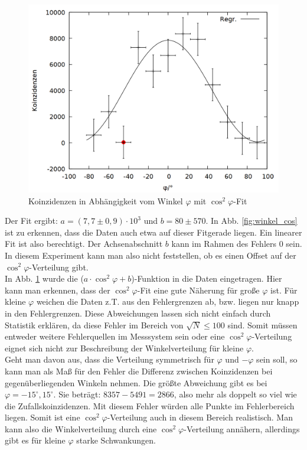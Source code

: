\begin{figure}
\centering
\includegraphics[width=0.75\linewidth]{data/friedrich/winkel_ges.png}
\caption{Koinzidenzen in Abhängigkeit vom Winkel $\varphi$ mit $\cos^2{\varphi}$-Fit}
\label{fig:winkel_ges}
\end{figure}

Der Fit ergibt: $a = (7,7 \pm 0,9)\cdot 10^3$ und $b = 80 \pm 570$. In Abb. \ref{fig:winkel_cos} ist zu erkennen, dass die Daten auch etwa auf dieser Fitgerade liegen. Ein linearer Fit ist also berechtigt. Der Achsenabschnitt $b$ kann im Rahmen des Fehlers 0 sein. In diesem Experiment kann man also nicht feststellen, ob es einen Offset auf der $\cos^2{\varphi}$-Verteilung gibt.\\

In Abb. \ref{fig:winkel_ges} wurde die ($a \cdot \cos^2{\varphi} + b$)-Funktion in die Daten eingetragen. Hier kann man erkennen, dass der  $\cos^2{\varphi}$-Fit eine gute Näherung für große $\varphi$ ist. Für kleine $\varphi$ weichen die Daten z.T. aus den Fehlergrenzen ab, bzw. liegen nur knapp in den Fehlergrenzen. Diese Abweichungen lassen sich nicht einfach durch Statistik erklären, da diese Fehler im Bereich von $\sqrt{N} \leq 100$ sind. Somit müssen entweder weitere Fehlerquellen im Messsystem sein oder eine $\cos^2{\varphi}$-Verteilung eignet sich nicht zur Beschreibung der Winkelverteilung für kleine $\varphi$.\\

Geht man davon aus, dass die Verteilung symmetrisch für $\varphi$ und $-\varphi$ sein soll, so kann man als Maß für den Fehler die Differenz zwischen Koinzidenzen bei gegenüberliegenden Winkeln nehmen. Die größte Abweichung gibt es bei $\varphi = -15^\circ,15^\circ$. Sie beträgt: $8357
 - 5491 = 2866$, also mehr als doppelt so viel wie die Zufallskoinzidenzen. Mit diesem Fehler würden alle Punkte im Fehlerbereich liegen. Somit ist eine $\cos^2{\varphi}$-Verteilung auch in diesem Bereich realistisch. Man kann also die Winkelverteilung durch eine $\cos^2{\varphi}$-Verteilung annähern, allerdings gibt es für kleine $\varphi$ starke Schwankungen.\\
 

